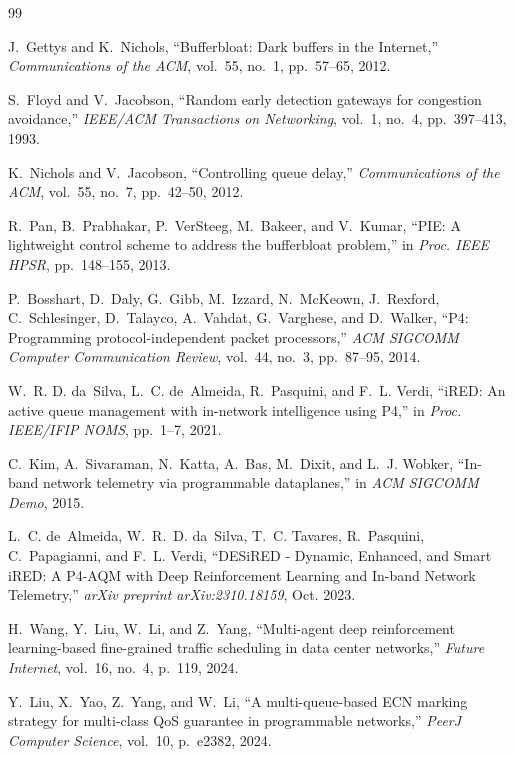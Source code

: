 \documentclass[12pt,a4paper,oneside]{report}
\begin{document}
\cleardoublepage
{}
\begin{thebibliography}{99}

J.~Gettys and K.~Nichols, ``Bufferbloat: Dark buffers in the Internet,'' \emph{Communications of the ACM}, vol.~55, no.~1, pp.~57--65, 2012.

S.~Floyd and V.~Jacobson, ``Random early detection gateways for congestion avoidance,'' \emph{IEEE/ACM Transactions on Networking}, vol.~1, no.~4, pp.~397--413, 1993.

K.~Nichols and V.~Jacobson, ``Controlling queue delay,'' \emph{Communications of the ACM}, vol.~55, no.~7, pp.~42--50, 2012.

R.~Pan, B.~Prabhakar, P.~VerSteeg, M.~Bakeer, and V.~Kumar, ``PIE: A lightweight control scheme to address the bufferbloat problem,'' in \emph{Proc. IEEE HPSR}, pp.~148--155, 2013.

P.~Bosshart, D.~Daly, G.~Gibb, M.~Izzard, N.~McKeown, J.~Rexford, C.~Schlesinger, D.~Talayco, A.~Vahdat, G.~Varghese, and D.~Walker, ``P4: Programming protocol-independent packet processors,'' \emph{ACM SIGCOMM Computer Communication Review}, vol.~44, no.~3, pp.~87--95, 2014.

W.~R. D. da~Silva, L.~C. de~Almeida, R.~Pasquini, and F.~L. Verdi, ``iRED: An active queue management with in-network intelligence using P4,'' in \emph{Proc. IEEE/IFIP NOMS}, pp.~1--7, 2021.

C.~Kim, A.~Sivaraman, N.~Katta, A.~Bas, M.~Dixit, and L.~J. Wobker, ``In-band network telemetry via programmable dataplanes,'' in \emph{ACM SIGCOMM Demo}, 2015.

L.~C. de~Almeida, W.~R.~D. da~Silva, T.~C. Tavares, R.~Pasquini, C.~Papagianni, and F.~L. Verdi, ``DESiRED - Dynamic, Enhanced, and Smart iRED: A P4-AQM with Deep Reinforcement Learning and In-band Network Telemetry,'' \emph{arXiv preprint arXiv:2310.18159}, Oct. 2023.

H.~Wang, Y.~Liu, W.~Li, and Z.~Yang, ``Multi-agent deep reinforcement learning-based fine-grained traffic scheduling in data center networks,'' \emph{Future Internet}, vol.~16, no.~4, p.~119, 2024.

Y.~Liu, X.~Yao, Z.~Yang, and W.~Li, ``A multi-queue-based ECN marking strategy for multi-class QoS guarantee in programmable networks,'' \emph{PeerJ Computer Science}, vol.~10, p.~e2382, 2024.


\end{thebibliography}
\end{document}
